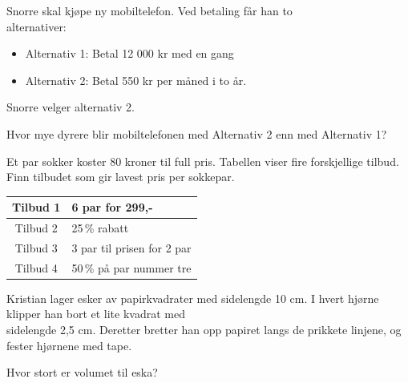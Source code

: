 






\newpage

Snorre skal kjøpe ny mobiltelefon.
Ved betaling får han to\\ alternativer:
\begin{itemize}
	\item[] Alternativ 1: Betal 12 000 kr med en gang
	\item[] Alternativ 2: Betal 550 kr per måned i to år.
\end{itemize}
Snorre velger alternativ 2. \os

Hvor mye dyrere blir mobiltelefonen med Alternativ 2 enn med Alternativ 1?


Et par sokker koster 80 kroner til full pris. Tabellen viser fire forskjellige tilbud. Finn tilbudet som gir lavest pris per sokkepar. 
\begin{center}
	\renewcommand{\arraystretch}{1.5}
	\begin{table}[h]
		\centering
		\begin{tabular}{|c|l|}
			\hline
			Tilbud 1 & 6 par for 299,- \\
			\hline
			Tilbud 2 & 25\,\% rabatt \\
			\hline
			Tilbud 3 & 3 par til prisen for 2 par \\
			\hline
			Tilbud 4 & 50\,\% på par nummer tre \\
			\hline
		\end{tabular}
	\end{table}
\end{center}
Kristian lager esker av papirkvadrater med sidelengde 10 cm. \os
I hvert hjørne klipper han bort et lite kvadrat med\\ sidelengde 2,5 cm. \os
Deretter bretter han opp papiret langs de prikkete linjene, og\\ fester hjørnene med tape. \os

Hvor stort er volumet til eska?

